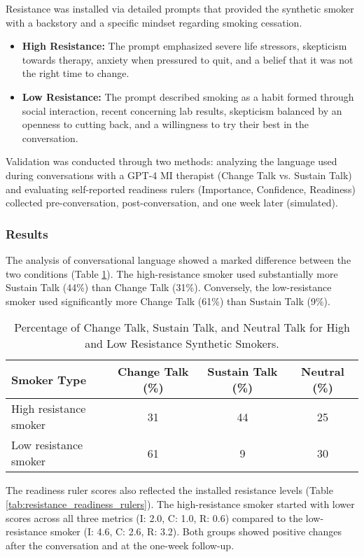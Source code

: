 Resistance was installed via detailed prompts that provided the synthetic smoker with a backstory and a specific mindset regarding smoking cessation.
\begin{itemize}
    \item \textbf{High Resistance:} The prompt emphasized severe life stressors, skepticism towards therapy, anxiety when pressured to quit, and a belief that it was not the right time to change.
    \item \textbf{Low Resistance:} The prompt described smoking as a habit formed through social interaction, recent concerning lab results, skepticism balanced by an openness to cutting back, and a willingness to try their best in the conversation.
\end{itemize}
Validation was conducted through two methods: analyzing the language used during conversations with a GPT-4 MI therapist (Change Talk vs. Sustain Talk) and evaluating self-reported readiness rulers (Importance, Confidence, Readiness) collected pre-conversation, post-conversation, and one week later (simulated).

\subsubsection{Results}

The analysis of conversational language showed a marked difference between the two conditions (Table \ref{tab:resistance_change_sustain}). The high-resistance smoker used substantially more Sustain Talk (44\%) than Change Talk (31\%). Conversely, the low-resistance smoker used significantly more Change Talk (61\%) than Sustain Talk (9\%).

\begin{table}[h]
\centering
\caption{Percentage of Change Talk, Sustain Talk, and Neutral Talk for High and Low Resistance Synthetic Smokers.}
\label{tab:resistance_change_sustain}
\begin{tabular}{|l|c|c|c|}
\hline
\textbf{Smoker Type} & \textbf{Change Talk (\%)} & \textbf{Sustain Talk (\%)} & \textbf{Neutral (\%)} \\ \hline
High resistance smoker & 31 & 44 & 25 \\ \hline
Low resistance smoker & 61 & 9 & 30 \\ \hline
\end{tabular}
\end{table}

The readiness ruler scores also reflected the installed resistance levels (Table \ref{tab:resistance_readiness_rulers}). The high-resistance smoker started with lower scores across all three metrics (I: 2.0, C: 1.0, R: 0.6) compared to the low-resistance smoker (I: 4.6, C: 2.6, R: 3.2). Both groups showed positive changes after the conversation and at the one-week follow-up.

